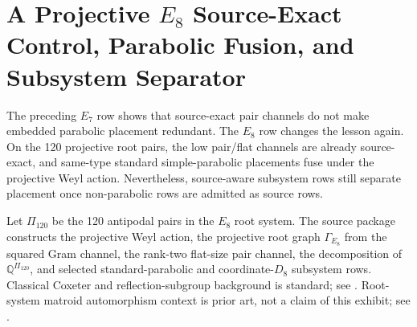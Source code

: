 \section{A Projective \texorpdfstring{\(E_8\)}{E8} Source-Exact Control, Parabolic Fusion, and Subsystem Separator}
\label{sec:e8-root-shadow-subsystem-separator}

The preceding \(E_7\) row shows that source-exact pair channels do not make embedded parabolic placement redundant.  The \(E_8\) row changes the lesson again.  On the 120 projective root pairs, the low pair/flat channels are already source-exact, and same-type standard simple-parabolic placements fuse under the projective Weyl action.  Nevertheless, source-aware subsystem rows still separate placement once non-parabolic rows are admitted as source rows.

Let \(\Pi_{120}\) be the 120 antipodal pairs in the \(E_8\) root system.  The source package constructs the projective Weyl action, the projective root graph \(\Gamma_{E_8}\) from the squared Gram channel, the rank-two flat-size pair channel, the decomposition of \(\mathbb Q^{\Pi_{120}}\), and selected standard-parabolic and coordinate-\(D_8\) subsystem rows.  Classical Coxeter and reflection-subgroup background is standard; see \cite{BjornerBrenti2005,DyerLehrer2010ReflectionSubgroups}.  Root-system matroid automorphism context is prior art, not a claim of this exhibit; see \cite{DutourSikiricFeliksonTumarkin2008RootMatroids}.

